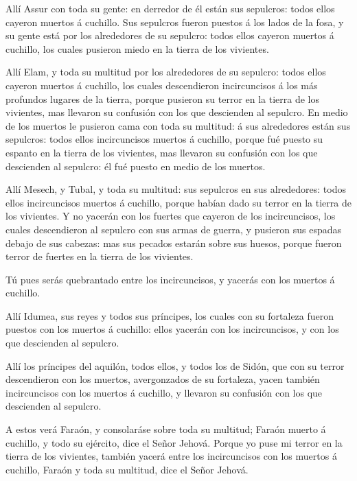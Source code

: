  Allí Assur con toda su gente: en derredor de él están sus
sepulcros: todos ellos cayeron muertos á cuchillo.  Sus
sepulcros fueron puestos á los lados de la fosa, y su gente está por los
alrededores de su sepulcro: todos ellos cayeron muertos á cuchillo, los
cuales pusieron miedo en la tierra de los vivientes.

 Allí Elam, y toda su multitud por los alrededores de su
sepulcro: todos ellos cayeron muertos á cuchillo, los cuales
descendieron incircuncisos á los más profundos lugares de la tierra,
porque pusieron su terror en la tierra de los vivientes, mas llevaron su
confusión con los que descienden al sepulcro.  En medio de
los muertos le pusieron cama con toda su multitud: á sus alrededores
están sus sepulcros: todos ellos incircuncisos muertos á cuchillo,
porque fué puesto su espanto en la tierra de los vivientes, mas llevaron
su confusión con los que descienden al sepulcro: él fué puesto en medio
de los muertos.

 Allí Mesech, y Tubal, y toda su multitud: sus sepulcros en
sus alrededores: todos ellos incircuncisos muertos á cuchillo, porque
habían dado su terror en la tierra de los vivientes.  Y no
yacerán con los fuertes que cayeron de los incircuncisos, los cuales
descendieron al sepulcro con sus armas de guerra, y pusieron sus espadas
debajo de sus cabezas: mas sus pecados estarán sobre sus huesos, porque
fueron terror de fuertes en la tierra de los vivientes.

 Tú pues serás quebrantado entre los incircuncisos, y
yacerás con los muertos á cuchillo.

 Allí Idumea, sus reyes y todos sus príncipes, los cuales
con su fortaleza fueron puestos con los muertos á cuchillo: ellos
yacerán con los incircuncisos, y con los que descienden al sepulcro.

 Allí los príncipes del aquilón, todos ellos, y todos los
de Sidón, que con su terror descendieron con los muertos, avergonzados
de su fortaleza, yacen también incircuncisos con los muertos á cuchillo,
y llevaron su confusión con los que descienden al sepulcro.

 A estos verá Faraón, y consolaráse sobre toda su multitud;
Faraón muerto á cuchillo, y todo su ejército, dice el Señor Jehová.
 Porque yo puse mi terror en la tierra de los vivientes,
también yacerá entre los incircuncisos con los muertos á cuchillo,
Faraón y toda su multitud, dice el Señor Jehová.


